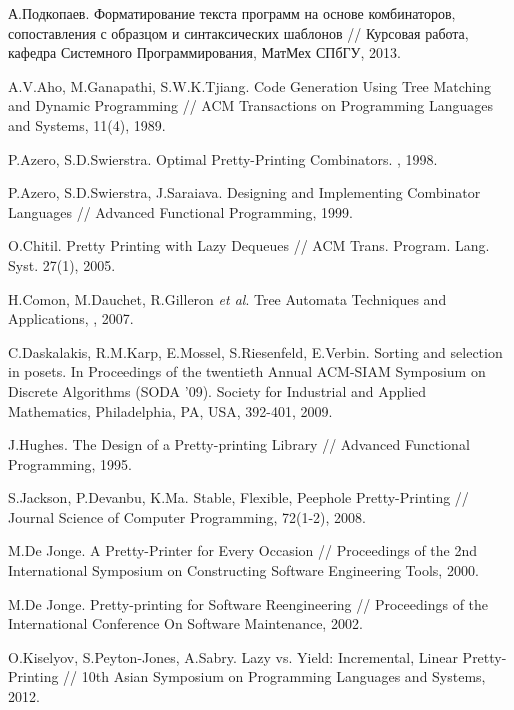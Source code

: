 
% 
% 

\begin{thebibliography}{9001}

 А.Подкопаев. Форматирование текста программ на основе комбинаторов, сопоставления с образцом и синтаксических шаблонов
// Курсовая работа, кафедра Системного Программирования, МатМех СПбГУ, 2013.

 A.V.Aho, M.Ganapathi, S.W.K.Tjiang. Code Generation Using Tree Matching and Dynamic Programming // ACM Transactions on Programming Languages and Systems, 
11(4), 1989.

 P.Azero, S.D.Swierstra. Optimal Pretty-Printing Combinators. , 1998.

 P.Azero, S.D.Swierstra, J.Saraiava. Designing and Implementing Combinator Languages // Advanced Functional Programming, 1999.

 O.Chitil. Pretty Printing with Lazy Dequeues // ACM Trans. Program. Lang. Syst. 27(1), 2005.

 H.Comon, M.Dauchet, R.Gilleron \emph{et al}. Tree Automata Techniques and Applications, , 2007.

 C.Daskalakis, R.M.Karp, E.Mossel, S.Riesenfeld, E.Verbin.
Sorting and selection in posets.
In Proceedings of the twentieth Annual ACM-SIAM Symposium on Discrete
Algorithms (SODA '09). Society for Industrial and Applied Mathematics, Philadelphia, PA, USA, 392-401, 2009.


 J.Hughes. The Design of a Pretty-printing Library // Advanced Functional Programming, 1995.

 S.Jackson, P.Devanbu, K.Ma. Stable, Flexible, Peephole Pretty-Printing // Journal Science of Computer Programming, 72(1-2), 2008.

 M.De Jonge. A Pretty-Printer for Every Occasion // Proceedings of the 2nd International Symposium on Constructing 
Software Engineering Tools, 2000.

 M.De Jonge. Pretty-printing for Software Reengineering // Proceedings of the International Conference On Software Maintenance, 2002.

 O.Kiselyov, S.Peyton-Jones, A.Sabry. Lazy vs. Yield: Incremental, Linear Pretty-Printing // 10th Asian Symposium on Programming Languages and Systems, 
2012.


\end{thebibliography}
